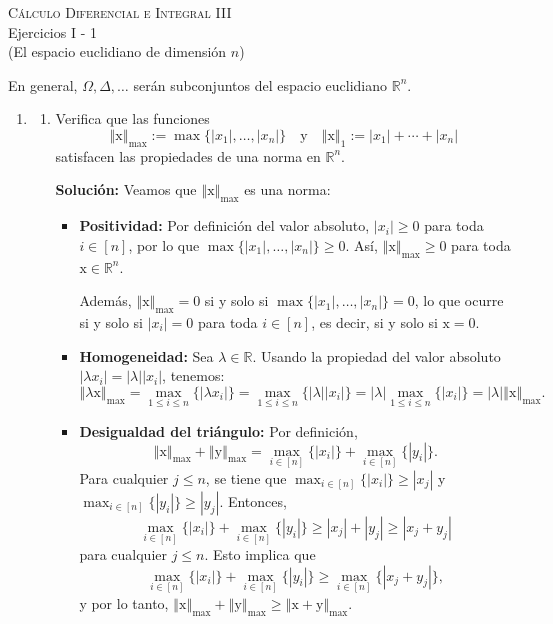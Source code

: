 \documentclass[12pt]{article}
\newcommand{\abs}[1]{\left\vert#1\right\vert}
\newcommand{\norm}[1]{\left\Vert#1\right\Vert}
\newcommand{\R}{\mathbb R}
\newcommand{\x}{\mathrm x}
\newcommand{\y}{\mathrm y}
\begin{document}
\pagestyle{empty}
\begin{center}
{\textsc{Cálculo Diferencial e Integral III} \\
\medskip 
\large{Ejercicios I - 1 \\
(El espacio euclidiano de dimensión $n$)}}
\end{center}
\bigskip

En general, $\Omega,\Delta, \dots$ serán subconjuntos del espacio euclidiano $\R^n$.

\begin{enumerate}

\item 
\begin{enumerate}[(1)]
\item Verifica que las funciones
\[ 
\norm{\x}_{\max} := \max\{\abs{x_1},\ldots,\abs{x_n}\} \quad \text{y}\quad 
\norm{\x}_1 := \abs{x_1} + \cdots + \abs{x_n} 
\]
satisfacen las propiedades de una norma en $\R^n$.

\textbf{Solución: } Veamos que \(\norm{\x}_{\max}\) es una norma:
    \begin{itemize}
        \item \textbf{Positividad:} Por definición del valor absoluto, \(\abs{x_i} \geq 0\) para toda \(i \in [n]\), por lo que \(\max\{\abs{x_1}, \dots, \abs{x_n}\} \geq 0\). Así, \(\norm{\x}_{\max} \geq 0\) para toda \(\x \in \R^n\).
        
        Además, \(\norm{\x}_{\max} = 0\) si y solo si \(\max\{\abs{x_1}, \dots, \abs{x_n}\} = 0\), lo que ocurre si y solo si \(\abs{x_i} = 0\) para toda \(i \in [n]\), es decir, si y solo si \(\x = 0\).
        
        \item \textbf{Homogeneidad:} Sea \(\lambda \in \R\). Usando la propiedad del valor absoluto \(\abs{\lambda x_i} = \abs{\lambda} \abs{x_i}\), tenemos:
        \[
        \norm{\lambda \x}_{\max} = \max_{1 \leq i \leq n}\{\abs{\lambda x_i}\} = \max_{1 \leq i \leq n}\{\abs{\lambda} \abs{x_i}\} = \abs{\lambda} \max_{1 \leq i \leq n}\{\abs{x_i}\} = \abs{\lambda} \norm{\x}_{\max}.
        \]
        
        \item \textbf{Desigualdad del triángulo:} Por definición, 
        \[
        \norm{\x}_{\max} + \norm{\y}_{\max} = \max_{i\in[n]}\{\abs{x_i}\} + \max_{i\in[n]}\{\abs{y_i}\}.
        \]
        Para cualquier \(j \leq n\), se tiene que \(\max_{i\in[n]}\{\abs{x_i}\} \geq \abs{x_j}\) y \(\max_{i\in[n]}\{\abs{y_i}\} \geq \abs{y_j}\). Entonces,
        \[
        \max_{i\in[n]}\{\abs{x_i}\} + \max_{i\in[n]}\{\abs{y_i}\} \geq \abs{x_j} + \abs{y_j} \geq \abs{x_j + y_j}
        \]
        para cualquier \(j \leq n\). Esto implica que
        \[
        \max_{i\in[n]}\{\abs{x_i}\} + \max_{i\in[n]}\{\abs{y_i}\} \geq \max_{i \in [n]}\{\abs{x_j + y_j}\},
        \]
        y por lo tanto, \(\norm{\x}_{\max} + \norm{\y}_{\max} \geq \norm{\x + \y}_{\max}\).
    \end{itemize}
    

\end{enumerate}
\end{enumerate}
\end{document}
